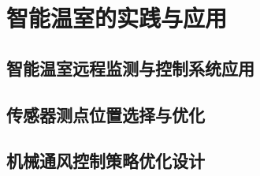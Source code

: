 

\chapter{智能温室的实践与应用}
\label{chapter:Application}

\section{智能温室远程监测与控制系统应用}

\section{传感器测点位置选择与优化}

\section{机械通风控制策略优化设计}